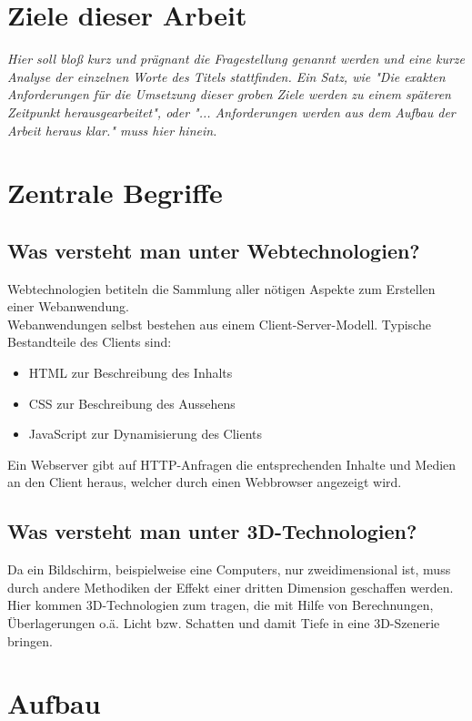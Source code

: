 \section{Ziele dieser Arbeit}
\label{sec:ziele_dieser_arbeit}

\emph{Hier soll bloß kurz und prägnant die Fragestellung genannt werden und eine kurze Analyse der einzelnen Worte des Titels stattfinden. Ein Satz, wie "Die exakten Anforderungen für die Umsetzung dieser groben Ziele werden zu einem späteren Zeitpunkt herausgearbeitet", oder "... Anforderungen werden aus dem Aufbau der Arbeit heraus klar." muss hier hinein.}

\section{Zentrale Begriffe}
\label{sec:zentrale_begriffe}

\subsection{Was versteht man unter Webtechnologien?}
Webtechnologien betiteln die Sammlung aller nötigen Aspekte zum Erstellen einer Webanwendung.\\
Webanwendungen selbst bestehen aus einem Client-Server-Modell.
Typische Bestandteile des Clients sind: 
\begin{itemize}
	\item HTML zur Beschreibung des Inhalts
	\item CSS zur Beschreibung des Aussehens
	\item JavaScript zur Dynamisierung des Clients
\end{itemize}
Ein Webserver gibt auf HTTP-Anfragen die entsprechenden Inhalte und Medien an den Client heraus, welcher durch einen Webbrowser angezeigt wird.
\subsection{Was versteht man unter 3D-Technologien?}
Da ein Bildschirm, beispielweise eine Computers, nur zweidimensional ist, muss durch andere Methodiken der Effekt einer dritten Dimension geschaffen werden. Hier kommen 3D-Technologien zum tragen, die mit Hilfe von Berechnungen, Überlagerungen o.ä. Licht bzw. Schatten und damit Tiefe in eine 3D-Szenerie bringen.
\section{Aufbau}
\label{sec:aufbau}

